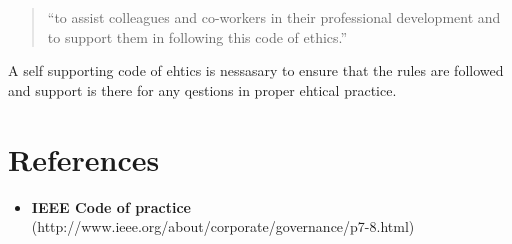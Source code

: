 \documentclass[11pt]{article}
\begin{document}
\begin{quotation}
  ``to assist colleagues and co-workers in their professional development and to
  support them in following this code of ethics.''
\end{quotation}
A self supporting code of ehtics is nessasary to ensure that the rules are
followed and support is there for any qestions in proper ehtical practice.

\section{References}
\begin{itemize}
  \item {\textbf{IEEE Code of practice}
  (http://www.ieee.org/about/corporate/governance/p7-8.html)}
\end{itemize}
\end{document}
